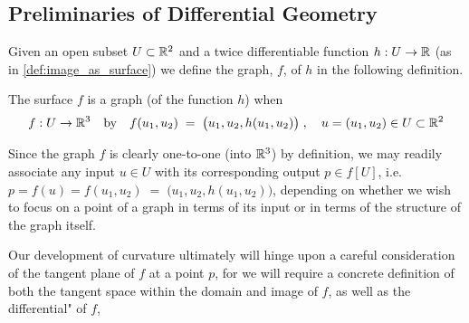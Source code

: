 \subsection{Preliminaries of Differential Geometry}
    Given an open subset $U\subset \mathbb{R}^2$ and a twice differentiable function  $h: U \to \mathbb{R}$ (as in \cref{def:image_as_surface})
    we define the graph, $f$, of $h$ in the following definition.
    
    \begin{defn} \label{def:graph}
    The surface $f$ is a graph (of the function $h$) when 
    \[
     f: U \to \mathbb{R}^3 \quad \textrm{by} \quad f(u_1, u_2) \;=\; \big(u_1 , u_2 , h(u_1,u_2)\big)
     \;,\quad u = (u_1, u_2) \in U \subset \mathbb{R}^2 \]
    \end{defn}
    Since the graph $f$ is clearly one-to-one (into $\mathbb{R}^3$) by definition, we may readily associate any input $u\in U$ with
    its corresponding output $p \in f[U]$, i.e.
    $ p = f(u) = f(u_1, u_2) \;=\; \big(u_1 , u_2 , h(u_1,u_2)\big)$,
    depending on whether we wish to focus on a point of a graph in terms of its input
    or in terms of the structure of the graph itself.
    
    Our development of curvature ultimately will hinge upon a careful consideration of the tangent plane of $f$ at a point $p$, for we will require a concrete definition of both the tangent space within the domain and image of $f$,
    as well as the differential" of $f$,
    
